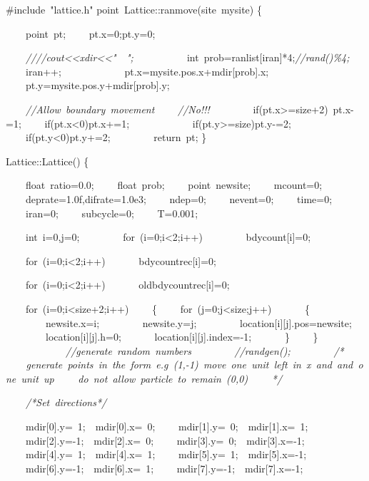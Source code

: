 {\ttfamily \raggedright \footnotesize
\#include\ "{}lattice.h"{}
point\ Lattice::ranmove(site\ mysite)
\{

\ \ \ \ point\ pt;
\ \ \ \ pt.x=0;pt.y=0;

\ \ \ \ \textsl{////cout<{}<{}xdir<{}<{}"{}\ \ "{};\ \ }
\ \ \ \
\ \ \ \ int\ prob=ranlist[iran]*4;\textsl{//rand()\%4;}
\ \ \ \ iran++;
\ \ \ \
\ \ \ \
\ \ \ \ pt.x=mysite.pos.x+mdir[prob].x;
\ \ \ \ pt.y=mysite.pos.y+mdir[prob].y;

\ \ \ \ \textsl{//Allow\ boundary\ movement}
\ \ \ \ \textsl{//No!!!}
\ \ \ \
\ \ \ \ if(pt.x>{}=size+2)\ pt.x-{}=1;
\ \ \ \ if(pt.x<{}0)pt.x+=1;
\ \ \ \
\ \ \ \
\ \ \ \ if(pt.y>{}=size)pt.y-{}=2;
\ \ \ \ if(pt.y<{}0)pt.y+=2;
\ \ \ \
\ \ \ \ return\ pt;
\}

Lattice::Lattice()
\{

\ \ \ \ float\ ratio=0.0;
\ \ \ \ float\ prob;
\ \ \ \ point\ newsite;
\ \ \ \ mcount=0;
\ \ \ \ deprate=1.0f,difrate=1.0e3;
\ \ \ \ ndep=0;
\ \ \ \ nevent=0;
\ \ \ \ time=0;
\ \ \ \ iran=0;
\ \ \ \ subcycle=0;
\ \ \ \ T=0.001;

\ \ \ \ int\ i=0,j=0;
\ \ \ \
\ \ \ \ for\ (i=0;i<{}2;i++)
\ \ \ \ \ \ \ \ bdycount[i]=0;

\ \ \ \ for\ (i=0;i<{}2;i++)
\ \ \ \ \ \ bdycountrec[i]=0;

\ \ \ \ for\ (i=0;i<{}2;i++)
\ \ \ \ \ \ oldbdycountrec[i]=0;

\ \ \ \ for\ (i=0;i<{}size+2;i++)
\ \ \ \ \{
\ \ \ \ for\ (j=0;j<{}size;j++)
\ \ \ \ \ \ \{
\ \ \ \ \ \ \ \ newsite.x=i;
\ \ \ \ \ \ \ \ newsite.y=j;
\ \ \ \ \ \ \ \ location[i][j].pos=newsite;
\ \ \ \ \ \ \ \ location[i][j].h=0;
\ \ \ \ \ \ location[i][j].index=-{}1;
\ \ \ \ \ \ \}
\ \ \ \ \}
\ \ \ \
\ \ \ \
\ \ \ \ \textsl{//generate\ random\ numbers}
\ \ \ \
\ \ \ \ \textsl{//randgen();}
\ \ \ \
\ \ \ \ \textsl{/*
\ \ \ \ generate\ points\ in\ the\ form\ e.g\ (1,-{}1)\ move\ one\ unit\ left\ in\ x\ and\ and\ one\ unit\ up
\ \ \ \ do\ not\ allow\ particle\ to\ remain\ (0,0)
\ \ \ \ */}


\ \ \ \ \textsl{/*Set\ directions*/}



\ \ \ \ mdir[0].y=\ 1;\ \ mdir[0].x=\ 0;
\ \ \ \ mdir[1].y=\ 0;\ \ mdir[1].x=\ 1;
\ \ \ \ mdir[2].y=-{}1;\ \ mdir[2].x=\ 0;
\ \ \ \ mdir[3].y=\ 0;\ \ mdir[3].x=-{}1;
\ \ \ \ mdir[4].y=\ 1;\ \ mdir[4].x=\ 1;
\ \ \ \ mdir[5].y=\ 1;\ \ mdir[5].x=-{}1;
\ \ \ \ mdir[6].y=-{}1;\ \ mdir[6].x=\ 1;
\ \ \ \ mdir[7].y=-{}1;\ \ mdir[7].x=-{}1;

}
